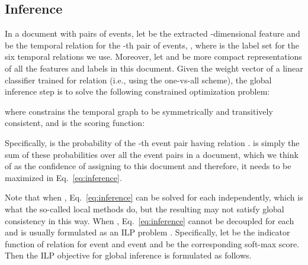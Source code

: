 \documentclass[11pt,letterpaper]{article}
\newcommand{\caly}{\mathcal{Y}}
\newcommand{\ignore}[1]{}
\newcommand{\final}[1]{#1}
\begin{document}
\subsection{Inference}
\label{sec:inference}
In a document with  pairs of events, let  be the extracted -dimensional feature and  be the temporal relation for the -th pair of events, , where  is the label set for the six temporal relations we use.
Moreover, let  and  be more compact representations of all the features and labels in this document.
Given the weight vector  of a linear classifier trained for relation  (i.e., using the one-vs-all scheme), the global inference step is to solve the following constrained optimization problem:

where  constrains the temporal graph to be symmetrically and transitively consistent, and  is the scoring function:

\final{Specifically,  is the probability of the -th event pair having relation .  is simply the sum of these probabilities over all the event pairs in a document, which we think of as the confidence of assigning  to this document and therefore, it needs to be maximized in Eq.~\eqref{eq:inference}.}

Note that when , Eq.~\eqref{eq:inference} can be solved for each  independently, which is what the so-called local methods do, \final{but the resulting  may not satisfy global consistency in this way.}
\final{When , Eq.~\eqref{eq:inference} cannot be decoupled for each } and is usually formulated as an ILP problem \citep{RothYi04,ChambersJu08,DoLuRo12}.
Specifically, let  be the indicator function of relation  for event  and event  and  be the corresponding soft-max score.
Then the ILP objective for global inference is formulated as follows.
\ignore{
\begin{argmaxi}
    {\mathcal{I}}{\sum_{ij\in\mathcal{E}}\sum_{r\in\caly} f_r(ij) \mathcal{I}_r(ij)}
    {}{}
    \addConstraint{\sum_{r}{\mathcal{I}_r(ij)} = 1}{}
    \addConstraint{\mathcal{I}_r(ij) = \mathcal{I}_{\bar{r}}(ji)}{}
    \addConstraint{\mathcal{I}_{r_1}(ij)+\mathcal{I}_{r_2}(jk)-\sum_{m=1}^N \mathcal{I}_{r_{3}^m}(ik)\le 1}{}
\end{argmaxi}}
\end{document}
